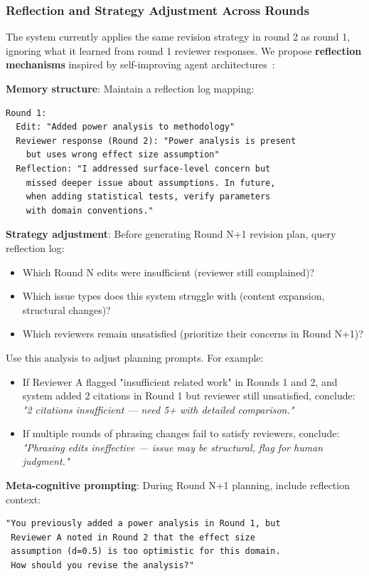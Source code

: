 \subsubsection{Reflection and Strategy Adjustment Across Rounds}

The system currently applies the same revision strategy in round 2 as round 1, ignoring what it learned from round 1 reviewer responses. We propose \textbf{reflection mechanisms} inspired by self-improving agent architectures~\cite{shinn2023reflexion,yao2023react}:

\textbf{Memory structure}: Maintain a reflection log mapping:
\begin{verbatim}
Round 1:
  Edit: "Added power analysis to methodology"
  Reviewer response (Round 2): "Power analysis is present
    but uses wrong effect size assumption"
  Reflection: "I addressed surface-level concern but
    missed deeper issue about assumptions. In future,
    when adding statistical tests, verify parameters
    with domain conventions."
\end{verbatim}

\textbf{Strategy adjustment}: Before generating Round N+1 revision plan, query reflection log:
\begin{itemize}
\item Which Round N edits were insufficient (reviewer still complained)?
\item Which issue types does this system struggle with (content expansion, structural changes)?
\item Which reviewers remain unsatisfied (prioritize their concerns in Round N+1)?
\end{itemize}

Use this analysis to adjust planning prompts. For example:
\begin{itemize}
\item If Reviewer A flagged "insufficient related work" in Rounds 1 and 2, and system added 2 citations in Round 1 but reviewer still unsatisfied, conclude: \textit{"2 citations insufficient — need 5+ with detailed comparison."}
\item If multiple rounds of phrasing changes fail to satisfy reviewers, conclude: \textit{"Phrasing edits ineffective — issue may be structural, flag for human judgment."}
\end{itemize}

\textbf{Meta-cognitive prompting}: During Round N+1 planning, include reflection context:
\begin{verbatim}
"You previously added a power analysis in Round 1, but
 Reviewer A noted in Round 2 that the effect size
 assumption (d=0.5) is too optimistic for this domain.
 How should you revise the analysis?"
\end{verbatim}

